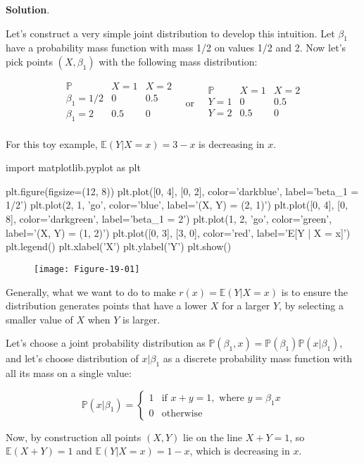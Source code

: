 \textbf{Solution}.

Let's construct a very simple joint distribution to develop this
intuition. Let \(\beta_1\) have a probability mass function with mass
1/2 on values 1/2 and 2. Now let's pick points \((X, \beta_1)\) with the
following mass distribution:

\[\begin{array}{c|cc}
\mathbb{P} & X = 1 & X = 2 \\
\hline
\beta_1 = 1/2 & 0 & 0.5 \\
\beta_1 = 2 & 0.5 & 0 \\
\end{array}
\quad \text{or} \quad
\begin{array}{c|cc}
\mathbb{P} & X = 1 & X = 2 \\
\hline
Y = 1 & 0 & 0.5 \\
Y = 2 & 0.5 & 0 \\
\end{array}
\]

For this toy example, \(\mathbb{E}(Y | X = x) = 3 - x\) is decreasing in
\(x\).

\begin{python}
import matplotlib.pyplot as plt

plt.figure(figsize=(12, 8))
plt.plot([0, 4], [0, 2], color='darkblue', label='beta_1 = 1/2')
plt.plot(2, 1, 'go', color='blue', label='(X, Y) = (2, 1)')
plt.plot([0, 4], [0, 8], color='darkgreen', label='beta_1 = 2')
plt.plot(1, 2, 'go', color='green', label='(X, Y) = (1, 2)')
plt.plot([0, 3], [3, 0], color='red', label='E[Y | X = x]')
plt.legend()
plt.xlabel('X')
plt.ylabel('Y')
plt.show()
\end{python}

\begin{figure}[H]
\texttt{[image: Figure-19-01]}
\end{figure}

Generally, what we want to do to make \(r(x) = \mathbb{E}(Y | X = x)\)
is to ensure the distribution generates points that have a lower \(X\)
for a larger \(Y\), by selecting a smaller value of \(X\) when \(Y\) is
larger.

Let's choose a joint probability distribution as
\(\mathbb{P}(\beta_1, x) = \mathbb{P}(\beta_1) \mathbb{P}(x | \beta_1)\),
and let's choose distribution of \(x | \beta_1\) as a discrete
probability mass function with all its mass on a single value:

\[
\mathbb{P}(x | \beta_1) = \begin{cases}
1 & \text{if } x + y = 1, \text{ where } y = \beta_1 x\\
0 & \text{otherwise}
\end{cases}
\]

Now, by construction all points \((X, Y)\) lie on the line
\(X + Y = 1\), so \(\mathbb{E}(X + Y) = 1\) and
\(\mathbb{E}(Y | X = x) = 1 - x\), which is decreasing in \(x\).
